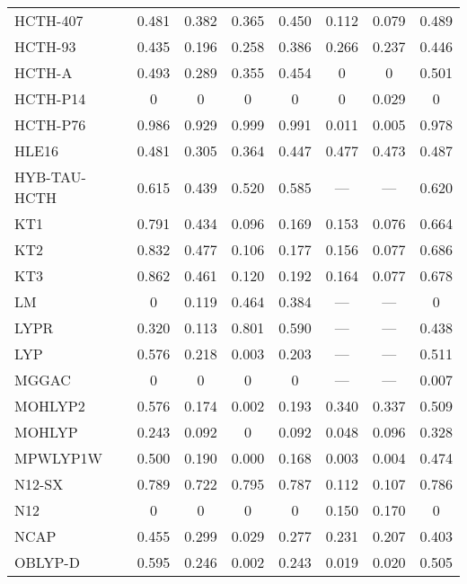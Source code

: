 \begin{table}
\begin{tabular}{|l|c|c|c|c|c|c|c|}
HCTH-407~\cite{Boese2001_5497} & 0.481 & 0.382 & 0.365 & 0.450 & 0.112 & 0.079 & 0.489 \\
HCTH-93~\cite{Hamprecht1998_6264} & 0.435 & 0.196 & 0.258 & 0.386 & 0.266 & 0.237 & 0.446 \\
HCTH-A~\cite{Hamprecht1998_6264} & 0.493 & 0.289 & 0.355 & 0.454 & 0 & 0 & 0.501 \\
HCTH-P14~\cite{Menconi2001_3958} & 0 & 0 & 0 & 0 & 0 & 0.029 & 0 \\
HCTH-P76~\cite{Menconi2001_3958} & 0.986 & 0.929 & 0.999 & 0.991 & 0.011 & 0.005 & 0.978 \\
HLE16~\cite{Verma2017_380} & 0.481 & 0.305 & 0.364 & 0.447 & 0.477 & 0.473 & 0.487 \\
HYB-TAU-HCTH~\cite{Boese2002_9559} & 0.615 & 0.439 & 0.520 & 0.585 & --- & --- & 0.620 \\
KT1~\cite{Keal2003_3015} & 0.791 & 0.434 & 0.096 & 0.169 & 0.153 & 0.076 & 0.664 \\
KT2~\cite{Keal2003_3015} & 0.832 & 0.477 & 0.106 & 0.177 & 0.156 & 0.077 & 0.686 \\
KT3~\cite{Keal2004_5654} & 0.862 & 0.461 & 0.120 & 0.192 & 0.164 & 0.077 & 0.678 \\
LM~\cite{Langreth1981_446,Hu1985_391} & 0 & 0.119 & 0.464 & 0.384 & --- & --- & 0 \\
LYPR~\cite{Ai2021_1207} & 0.320 & 0.113 & 0.801 & 0.590 & --- & --- & 0.438 \\
LYP~\cite{Lee1988_785,Miehlich1989_200} & 0.576 & 0.218 & 0.003 & 0.203 & --- & --- & 0.511 \\
MGGAC~\cite{Patra2019_155140} & 0 & 0 & 0 & 0 & --- & --- & 0.007 \\
MOHLYP2~\cite{Zheng2009_808} & 0.576 & 0.174 & 0.002 & 0.193 & 0.340 & 0.337 & 0.509 \\
MOHLYP~\cite{Schultz2005_11127} & 0.243 & 0.092 & 0 & 0.092 & 0.048 & 0.096 & 0.328 \\
MPWLYP1W~\cite{Dahlke2005_15677} & 0.500 & 0.190 & 0.000 & 0.168 & 0.003 & 0.004 & 0.474 \\
N12-SX~\cite{Peverati2012_16187} & 0.789 & 0.722 & 0.795 & 0.787 & 0.112 & 0.107 & 0.786 \\
N12~\cite{Peverati2012_2310} & 0 & 0 & 0 & 0 & 0.150 & 0.170 & 0 \\
NCAP~\cite{Carmona2019_303} & 0.455 & 0.299 & 0.029 & 0.277 & 0.231 & 0.207 & 0.403 \\
OBLYP-D~\cite{Goerigk2010_107} & 0.595 & 0.246 & 0.002 & 0.243 & 0.019 & 0.020 & 0.505 \\

\end{tabular}
\end{table}
